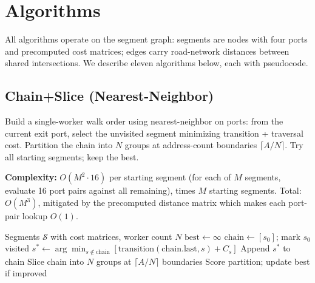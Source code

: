 \documentclass[conference]{IEEEtran}
\begin{document}
\section{Algorithms}
\label{sec:algorithms}

All algorithms operate on the segment graph: segments are nodes with four ports and precomputed cost matrices; edges carry road-network distances between shared intersections. We describe eleven algorithms below, each with pseudocode.

\subsection{Chain+Slice (Nearest-Neighbor)}

Build a single-worker walk order using nearest-neighbor on ports: from the current exit port, select the unvisited segment minimizing transition + traversal cost. Partition the chain into $N$ groups at address-count boundaries $\lceil A/N \rceil$. Try all starting segments; keep the best.

\textbf{Complexity:} $O(M^2 \cdot 16)$ per starting segment (for each of $M$ segments, evaluate 16 port pairs against all remaining), times $M$ starting segments. Total: $O(M^3)$, mitigated by the precomputed distance matrix which makes each port-pair lookup $O(1)$.

\begin{algorithm}[htbp]
\caption{Chain+Slice}
\label{alg:chainslice}
\begin{algorithmic}[1]
\REQUIRE Segments $\mathcal{S}$ with cost matrices, worker count $N$
\STATE $\text{best} \leftarrow \infty$
  \STATE $\text{chain} \leftarrow [s_0]$; mark $s_0$ visited
    \STATE $s^* \leftarrow \arg\min_{s \notin \text{chain}} [\text{transition}(\text{chain.last}, s) + C_s]$
    \STATE Append $s^*$ to chain
  \ENDWHILE
  \STATE Slice chain into $N$ groups at $\lceil A/N \rceil$ boundaries
  \STATE Score partition; update best if improved
\ENDFOR
\end{algorithmic}
\end{algorithm}
\end{document}
